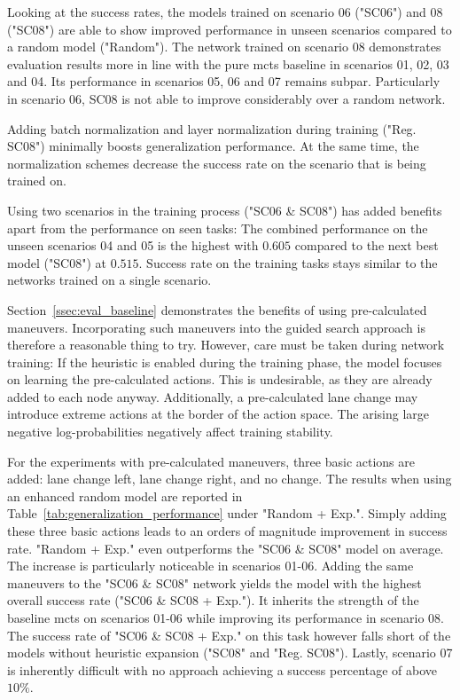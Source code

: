 Looking at the success rates, the models trained on scenario 06 ("SC06") and 08 ("SC08") are able to show improved performance in unseen scenarios compared to a random model ("Random"). The network trained on scenario 08 demonstrates evaluation results more in line with the pure \gls{mcts} baseline in scenarios 01, 02, 03 and 04. Its performance in scenarios 05, 06 and 07 remains subpar. Particularly in scenario 06, SC08 is not able to improve considerably over a random network.

Adding batch normalization \cite{ioffeBatchNormalizationAccelerating2015} and layer normalization \cite{baLayerNormalization2016} during training ("Reg. SC08") minimally boosts generalization performance. At the same time, the normalization schemes decrease the success rate on the scenario that is being trained on.

Using two scenarios in the training process ("SC06 \& SC08") has added benefits apart from the performance on seen tasks: The combined performance on the unseen scenarios 04 and 05 is the highest with $0.605$ compared to the next best model ("SC08") at $0.515$. Success rate on the training tasks stays similar to the networks trained on a single scenario.

Section~\ref{ssec:eval_baseline} demonstrates the benefits of using pre-calculated maneuvers. Incorporating such maneuvers into the guided search approach is therefore a reasonable thing to try. However, care must be taken during network training: If the heuristic is enabled during the training phase, the model focuses on learning the pre-calculated actions. This is undesirable, as they are already added to each node anyway. Additionally, a pre-calculated lane change may introduce extreme actions at the border of the action space. The arising large negative log-probabilities negatively affect training stability.

For the experiments with pre-calculated maneuvers, three basic actions are added: lane change left, lane change right, and no change. The results when using an enhanced random model are reported in Table~\ref{tab:generalization_performance} under "Random + Exp.". Simply adding these three basic actions leads to an orders of magnitude improvement in success rate. "Random + Exp." even outperforms the "SC06 \& SC08" model on average. The increase is particularly noticeable in scenarios 01-06. Adding the same maneuvers to the "SC06 \& SC08" network yields the model with the highest overall success rate ("SC06 \& SC08 + Exp."). It inherits the strength of the baseline \gls{mcts} on scenarios 01-06 while improving its performance in scenario 08. The success rate of "SC06 \& SC08 + Exp." on this task however falls short of the models without heuristic expansion ("SC08" and "Reg. SC08"). Lastly, scenario 07 is inherently difficult with no approach achieving a success percentage of above $10 \%$.

